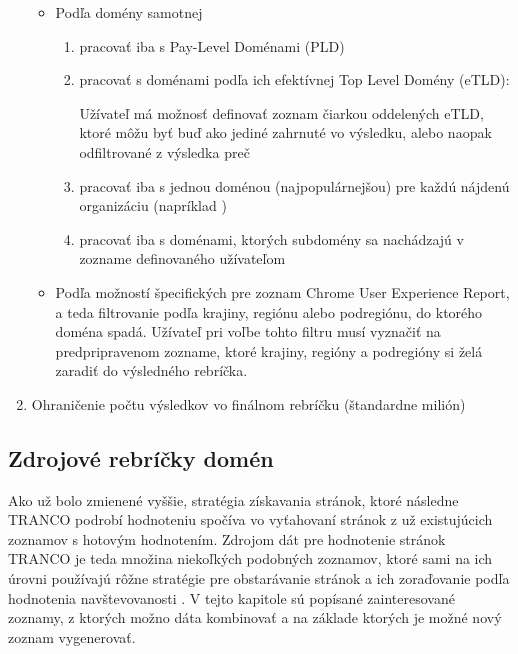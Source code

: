 \begin{enumerate}
\begin{itemize}
        \item Podľa domény samotnej
        \begin{enumerate}
            \item pracovať iba s Pay-Level Doménami (PLD)
            \item pracovať s doménami podľa ich efektívnej Top Level Domény (eTLD):
            
            Užívateľ má možnosť definovať zoznam čiarkou oddelených eTLD, ktoré môžu byť buď ako jediné zahrnuté vo
            výsledku, alebo naopak odfiltrované z výsledka preč
            
            \item pracovať iba s jednou doménou (najpopulárnejšou) pre každú nájdenú organizáciu (napríklad )
            \item pracovať iba s doménami, ktorých subdomény sa nachádzajú v zozname definovaného užívateľom 
        \end{enumerate}

        \item Podľa možností špecifických pre zoznam Chrome User Experience Report, a teda filtrovanie podľa krajiny, regiónu alebo podregiónu, do ktorého doména spadá. Užívateľ pri voľbe tohto filtru musí vyznačiť na predpripravenom zozname, ktoré krajiny, regióny a podregióny si želá zaradiť do výsledného rebríčka.
    \end{itemize}

    \item Ohraničenie počtu výsledkov vo finálnom rebríčku (štandardne milión)
    
\end{enumerate}


\subsection{Zdrojové rebríčky domén}
\label{tranco-source-rankings}

Ako už bolo zmienené vyššie, stratégia získavania stránok, ktoré následne TRANCO podrobí hodnoteniu spočíva vo vyťahovaní stránok z už existujúcich zoznamov s hotovým hodnotením. 
Zdrojom dát pre hodnotenie stránok TRANCO je teda množina niekoľkých podobných zoznamov, ktoré sami na ich úrovni používajú rôžne stratégie pre obstarávanie stránok a ich zoraďovanie 
podľa hodnotenia navštevovanosti \cite{tranco-methodology}. V tejto kapitole sú popísané zainteresované zoznamy, z ktorých možno dáta kombinovať 
a na základe ktorých je možné nový zoznam vygenerovať.

